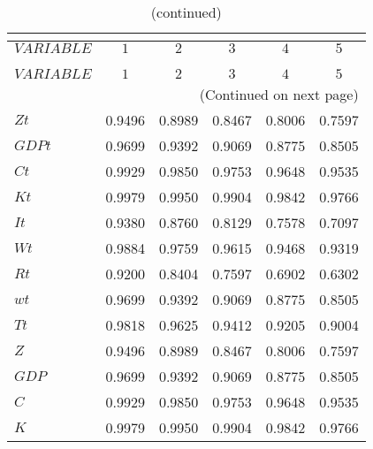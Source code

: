  
\begin{center}
\begin{longtable}{lccccc} 
\caption{AUTOCORRELATION OF SIMULATED VARIABLES}\\
 \label{Table:sim_autocorr_matrix}\\
\toprule 
$VARIABLE  $	 & 	 $         1$	 & 	 $         2$	 & 	 $         3$	 & 	 $         4$	 & 	 $         5$\\
\midrule \endfirsthead 
\caption{(continued)}\\
 \toprule \\ 
$VARIABLE  $	 & 	 $         1$	 & 	 $         2$	 & 	 $         3$	 & 	 $         4$	 & 	 $         5$\\
\midrule \endhead 
\midrule \multicolumn{6}{r}{(Continued on next page)} \\ \bottomrule \endfoot 
\bottomrule \endlastfoot 
$Zt        $	 & 	    0.9496	 & 	    0.8989	 & 	    0.8467	 & 	    0.8006	 & 	    0.7597 \\ 
$GDPt      $	 & 	    0.9699	 & 	    0.9392	 & 	    0.9069	 & 	    0.8775	 & 	    0.8505 \\ 
$Ct        $	 & 	    0.9929	 & 	    0.9850	 & 	    0.9753	 & 	    0.9648	 & 	    0.9535 \\ 
$Kt        $	 & 	    0.9979	 & 	    0.9950	 & 	    0.9904	 & 	    0.9842	 & 	    0.9766 \\ 
$It        $	 & 	    0.9380	 & 	    0.8760	 & 	    0.8129	 & 	    0.7578	 & 	    0.7097 \\ 
$Wt        $	 & 	    0.9884	 & 	    0.9759	 & 	    0.9615	 & 	    0.9468	 & 	    0.9319 \\ 
$Rt        $	 & 	    0.9200	 & 	    0.8404	 & 	    0.7597	 & 	    0.6902	 & 	    0.6302 \\ 
$wt        $	 & 	    0.9699	 & 	    0.9392	 & 	    0.9069	 & 	    0.8775	 & 	    0.8505 \\ 
$Tt        $	 & 	    0.9818	 & 	    0.9625	 & 	    0.9412	 & 	    0.9205	 & 	    0.9004 \\ 
$Z         $	 & 	    0.9496	 & 	    0.8989	 & 	    0.8467	 & 	    0.8006	 & 	    0.7597 \\ 
$GDP       $	 & 	    0.9699	 & 	    0.9392	 & 	    0.9069	 & 	    0.8775	 & 	    0.8505 \\ 
$C         $	 & 	    0.9929	 & 	    0.9850	 & 	    0.9753	 & 	    0.9648	 & 	    0.9535 \\ 
$K         $	 & 	    0.9979	 & 	    0.9950	 & 	    0.9904	 & 	    0.9842	 & 	    0.9766 \\ 

\end{longtable}
\end{center}
